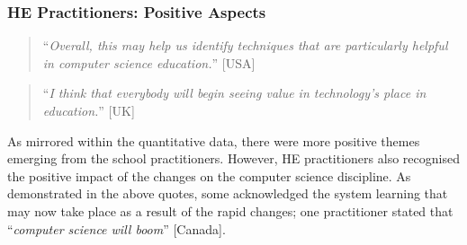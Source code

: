 \documentclass[conference]{IEEEtran}
\begin{document}

\subsubsection{HE Practitioners: Positive Aspects}

\begin{quotation}
``{\emph{Overall, this may help us identify techniques that are
particularly helpful in computer science education.}}'' [USA]
\end{quotation}

\begin{quotation}
``{\emph{I think that everybody will begin seeing value in
    technology’s place in education.}}'' [UK]
\end{quotation}


As mirrored within the quantitative data, there were more positive
themes emerging from the school practitioners. However, HE
practitioners also recognised the positive impact of the changes on
the computer science discipline. As demonstrated in the above quotes,
some acknowledged the system learning that may now take place as a
result of the rapid changes; one practitioner stated that
``{\emph{computer science will boom}}'' [Canada].
\end{document}
